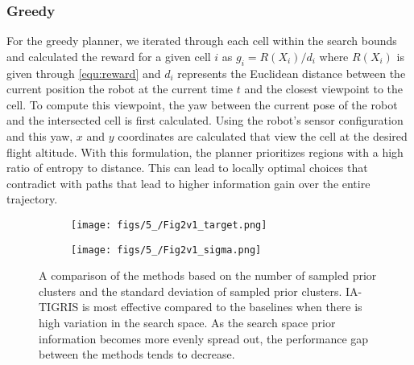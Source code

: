 \subsubsection{Greedy}

For the greedy planner, we iterated through each cell within the search bounds and calculated the reward for a given cell $i$ as $g_i = R(X_i) / d_i$ where $R(X_i)$ is given through \eqref{equ:reward} and $d_i$ represents the Euclidean distance between the current position the robot at the current time $t$ and the closest viewpoint to the cell. To compute this viewpoint, the yaw between the current pose of the robot and the intersected cell is first calculated. Using the robot's sensor configuration and this yaw, $x$ and $y$ coordinates are calculated that view the cell at the desired flight altitude. With this formulation, the planner prioritizes regions with a high ratio of entropy to distance. This can lead to locally optimal choices that contradict with paths that lead to higher information gain over the entire trajectory. 



\begin{figure*}[t]
    \centering
    \begin{subfigure}[b]{0.99\textwidth}
        \centering
        \texttt{[image: figs/5\_/Fig2v1\_target.png]}
    \end{subfigure}
    
    \begin{subfigure}[b]{0.99\textwidth}
        \centering
        \texttt{[image: figs/5\_/Fig2v1\_sigma.png]}
    \end{subfigure}
    \caption{A comparison of the methods based on the number of sampled prior clusters and the standard deviation of sampled prior clusters. IA-TIGRIS is most effective compared to the baselines when there is high variation in the search space. As the search space prior information becomes more evenly spread out, the performance gap between the methods tends to decrease.}
    \label{fig:targets_sigmas}
\end{figure*}

